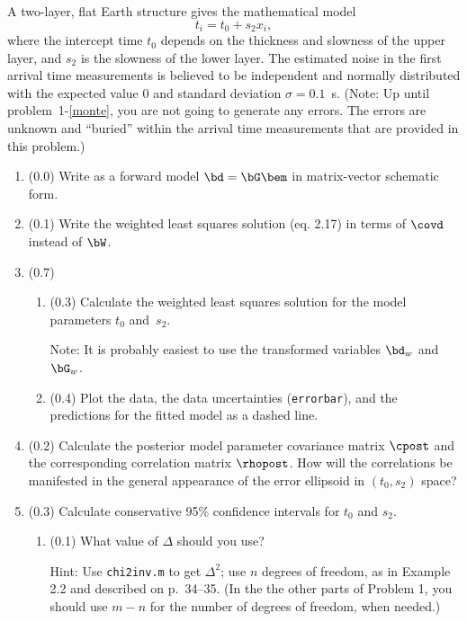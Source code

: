 \documentclass[11pt,titlepage,fleqn]{article}
\begin{document}
A two-layer, flat Earth structure gives the mathematical model
%
\begin{equation}
t_i = t_0 + s_2x_i,
\label{twolayer}
\end{equation}
%
where the intercept time $t_0$ depends on the thickness and slowness of the upper layer, and $s_2$ is the slowness of the lower layer. The estimated noise in the first arrival time measurements is believed to be independent and normally distributed with the expected value 0 and standard deviation $\sigma = 0.1$~s. (Note: Up until problem~1-\ref{monte}, you are not going to generate any errors. The errors are unknown and ``buried'' within the arrival time measurements that are provided in this problem.)
%
\begin{enumerate}
\item (0.0) Write  as a forward model $\bd = \bG\bem$ in matrix-vector schematic form.

\item (0.1) Write the weighted least squares solution (eq. 2.17) in terms of $\covd$ instead of $\bW$.

\item (0.7) 
\begin{enumerate}
\item (0.3) Calculate the weighted least squares solution for the model parameters $t_0$ and~$s_2$.

Note: It is probably easiest to use the transformed variables $\bd_w$ and $\bG_w$.
\item (0.4) Plot the data, the data uncertainties (\verb+errorbar+), and the predictions for the fitted model as a dashed line.
\end{enumerate}


\item (0.2) Calculate the posterior model parameter covariance matrix $\cpost$ and the corresponding correlation matrix $\rhopost$. How will the correlations be manifested in the general appearance of the error ellipsoid in $(t_0,s_2)$ space?

\pagebreak
\item (0.3) Calculate conservative 95\% confidence intervals for $t_0$ and $s_2$.
%
\begin{enumerate}
\item (0.1) What value of $\Delta$ should you use?

Hint: Use \verb+chi2inv.m+ to get $\Delta^2$; use $n$ degrees of freedom, as in Example 2.2 and described on p.~34--35. (In the the other parts of Problem 1, you should use $m-n$ for the number of degrees of freedom, when needed.)


\end{enumerate}
\end{enumerate}
\end{document}
